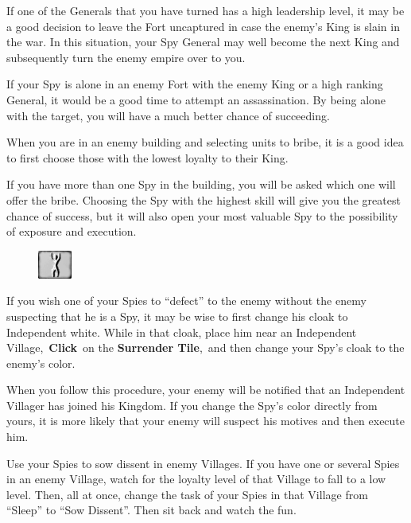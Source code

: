 If one of the Generals that you have turned has a high leadership level, it may be a good decision to leave the Fort uncaptured in case the enemy’s King is slain in the war. In this situation, your Spy General may well become the next King and subsequently turn the enemy empire over to you.

If your Spy is alone in an enemy Fort with the enemy King or a high ranking General, it would be a good time to attempt an assassination. By being alone with the target, you will have a much better chance of succeeding.

When you are in an enemy building and selecting units to bribe, it is a good idea to first choose those with the lowest loyalty to their King.

If you have more than one Spy in the building, you will be asked which one will offer the bribe. Choosing the Spy with the highest skill will give you the greatest chance of success, but it will also open your most valuable Spy to the possibility of exposure and execution.

\begin{figure}
	\vspace{-20pt}
	\begin{center}
		\includegraphics[width=0.1\textwidth]{Treveal}
	\end{center}
	\vspace{-20pt}
\end{figure}

If you wish one of your Spies to “defect” to the enemy without the enemy suspecting that he is a Spy, it may be wise to first change his cloak to Independent white. While in that cloak, place him near an Independent Village, \textbf{Click} on the \textbf{Surrender Tile}, and then change your Spy’s cloak to the enemy’s color.

When you follow this procedure, your enemy will be notified that an Independent Villager has joined his Kingdom. If you change the Spy’s color directly from yours, it is more likely that your enemy will suspect his motives and then execute him.

Use your Spies to sow dissent in enemy Villages. If you have one or several Spies in an enemy Village, watch for the loyalty level of that Village to fall to a low level. Then, all at once, change the task of your Spies in that Village from “Sleep” to “Sow Dissent”. Then sit back and watch the fun.

